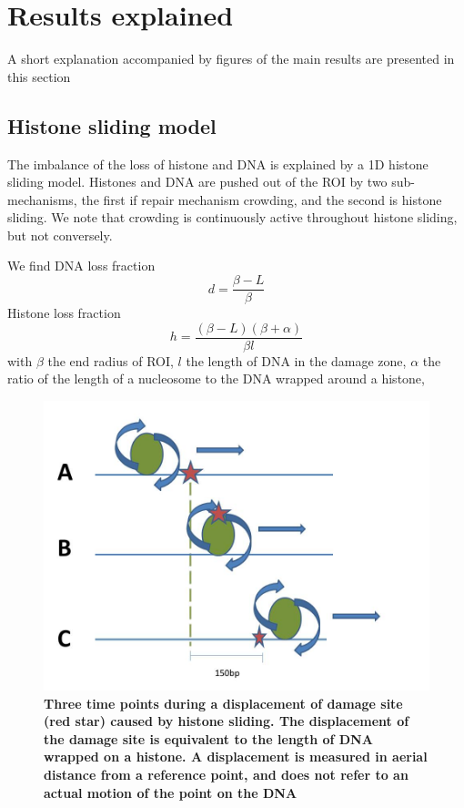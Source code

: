 \documentclass[12pt]{report}
\begin{document}
\section{Results explained}\label{section:ResultsExplained}
       A short explanation accompanied by figures of the main results are presented in this section

		\subsection{Histone sliding model}\label{subsection:HistoneSlidingModel}		   
		The imbalance of the loss of histone and DNA is explained by a 1D histone sliding model. Histones and DNA are pushed out of the ROI by two sub-mechanisms, the first if repair mechanism crowding, and the second is histone sliding. We note that crowding is continuously active throughout histone sliding, but not conversely.
		
		We find DNA loss fraction
		\begin{equation*}
        d=\frac{\beta-L}{\beta}
		\end{equation*}
		Histone loss fraction 
		\begin{equation*}
			h=\frac{(\beta -L)(\beta+\alpha)}{\beta l}
		\end{equation*}
		with $\beta$ the end radius of ROI, $l$ the length of DNA in the damage zone, $\alpha$ the ratio of the length of a nucleosome to the DNA wrapped around a histone, 
		
				   \begin{figure}[H]
				   	\centering
				   	\includegraphics[width=0.7\linewidth]{Images/SlidingModel/histoneSlidingSingle}
				   	\caption{\tiny{\textbf{Three time points during a displacement of damage site (red star) caused by histone sliding. The displacement of the damage site is equivalent to the length of DNA wrapped on a histone. A displacement is measured in aerial distance from a reference point, and does not refer to an actual motion of the point on the DNA}}}
				   	\label{fig:histoneSlidingSingle}
				   \end{figure}
				   
\end{document}
